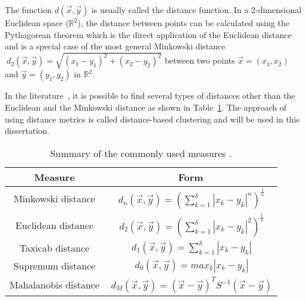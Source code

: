 The function \begin{math} d(\vec{x},\vec{y}) \end{math} is usually called the distance function. In a 2-dimensional Euclidean space ($\mathbb{R}^{2}$), the distance between points can be calculated using the Pythagorean theorem which is the direct application of the Euclidean distance and is a special case of the most general Minkowski distance \begin{math}\ d_{2}(\vec{x},\vec{y}) = \sqrt{(x_{1}-y_{1})^{2}+(x_{2}-y_{2})^{2}} \end{math} between two points $\vec{x}=(x_{1},x_{2})$ and $\vec{y}=(y_{1},y_{2})$ in $\mathbb{R}^{2}$.

In the literature~\cite{Mendelson75introduction}, it is possible to find several types of distances other than the Euclidean and the Minkowski distance as shown in Table~\ref{table:tableDist}. The approach of using distance metrics is called distance-based clustering and will be used in this dissertation.

    \begin{table}[ht]
    \caption {\small Summary of the commonly used measures \cite{Mendelson75introduction}.}
    \centering
    \begin{tabular}{c c }
    \hline\hline
    Measure & Form \\ [0.5ex]
    \hline
    \hline
    Minkowski distance & \begin{math}\ d_{n}(\vec{x},\vec{y}) = (\displaystyle \sum_{k=1}^\delta |x_{k}-y_{k}|^{n})^{\frac{1}{n}} \end{math} \\
    Euclidean distance & \begin{math}\ d_{2}(\vec{x},\vec{y}) = (\displaystyle \sum_{k=1}^\delta |x_{k}-y_{k}|^{2})^{\frac{1}{2}} \end{math} \\
    Taxicab distance & \begin{math}\ d_{1}(\vec{x},\vec{y}) = \displaystyle \sum_{k=1}^\delta |x_{k}-y_{k}| \end{math} \\
    Supremum distance & \begin{math}\ d_{0}(\vec{x},\vec{y}) = \displaystyle max_{k} |x_{k}-y_{k}| \end{math} \\
    Mahalanobis distance & \begin{math}\ d_{M}(\vec{x},\vec{y}) = (\vec{x}-\vec{y})^{T} S^{-1} (\vec{x}-\vec{y}) \end{math} \\
    \hline
    \end{tabular}
    \label{table:tableDist}
    \end{table}


